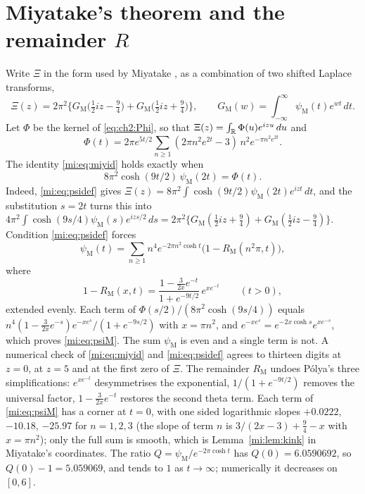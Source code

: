 \section{Miyatake's theorem and the remainder \texorpdfstring{$R$}{R}}\label{mi:sec:miyatake}

Write $\Xi$ in the form used by Miyatake \cite{Miyatake51b}, as a combination of two shifted Laplace transforms,
\begin{equation}\label{mi:eq:miyid}
\Xi(z)=2\pi^2\Big\{G_{\mathrm M}\big(\tfrac12iz-\tfrac94\big)+G_{\mathrm M}\big(\tfrac12iz+\tfrac94\big)\Big\},\qquad G_{\mathrm M}(w)=\int_{-\infty}^\infty\psi_{\mathrm M}(t)e^{wt}\,dt.
\end{equation}
Let $\Phi$ be the kernel of \eqref{eq:ch2:Phi}, so that $\Xi(z)=\int_{\mathbb{R}}\Phi(u)e^{izu}\,du$ and
\[
\Phi(t)=2\pi e^{5t/2}\sum_{n\ge1}(2\pi n^2e^{2t}-3)\,n^2e^{-\pi n^2e^{2t}}.
\]
The identity \eqref{mi:eq:miyid} holds exactly when
\begin{equation}\label{mi:eq:psidef}
8\pi^2\cosh(9t/2)\,\psi_{\mathrm M}(2t)=\Phi(t).
\end{equation}
Indeed, \eqref{mi:eq:psidef} gives $\Xi(z)=8\pi^2\int\cosh(9t/2)\psi_{\mathrm M}(2t)e^{izt}\,dt$, and the substitution $s=2t$ turns this into $4\pi^2\int\cosh(9s/4)\psi_{\mathrm M}(s)e^{izs/2}\,ds=2\pi^2\{G_{\mathrm M}(\frac12iz+\frac94)+G_{\mathrm M}(\frac12iz-\frac94)\}$. Condition \eqref{mi:eq:psidef} forces
\begin{equation}\label{mi:eq:psiM}
\psi_{\mathrm M}(t)=\sum_{n\ge1}n^4e^{-2\pi n^2\cosh t}\big(1-R_{\mathrm M}(n^2\pi,t)\big),
\end{equation}
where
\[
1-R_{\mathrm M}(x,t)=\frac{1-\frac3{2x}e^{-t}}{1+e^{-9t/2}}\,e^{xe^{-t}}\qquad(t>0),
\]
extended evenly. Each term of $\Phi(s/2)/(8\pi^2\cosh(9s/4))$ equals $n^4(1-\frac{3}{2x}e^{-s})e^{-xe^s}/(1+e^{-9s/2})$ with $x=\pi n^2$, and $e^{-xe^s}=e^{-2x\cosh s}e^{xe^{-s}}$, which proves \eqref{mi:eq:psiM}. The sum $\psi_{\mathrm M}$ is even and a single term is not. A numerical check of \eqref{mi:eq:miyid} and \eqref{mi:eq:psidef} agrees to thirteen digits at $z=0$, at $z=5$ and at the first zero of $\Xi$. The remainder $R_{\mathrm M}$ undoes P\'olya's three simplifications: $e^{xe^{-t}}$ desymmetrises the exponential, $1/(1+e^{-9t/2})$ removes the universal factor, $1-\frac3{2x}e^{-t}$ restores the second theta term. Each term of \eqref{mi:eq:psiM} has a corner at $t=0$, with one sided logarithmic slopes $+0.0222$, $-10.18$, $-25.97$ for $n=1,2,3$ (the slope of term $n$ is $3/(2x-3)+\frac94-x$ with $x=\pi n^2$); only the full sum is smooth, which is Lemma~\ref{mi:lem:kink} in Miyatake's coordinates. The ratio $Q=\psi_{\mathrm M}/e^{-2\pi\cosh t}$ has $Q(0)=6.0590692$, so $Q(0)-1=5.059069$, and tends to $1$ as $t\to\infty$; numerically it decreases on $[0,6]$.

